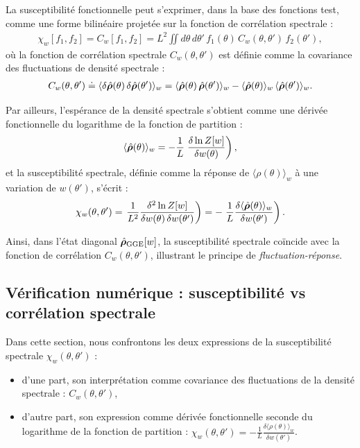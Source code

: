 La susceptibilité fonctionnelle peut s’exprimer, dans la base des fonctions test, comme une forme bilinéaire projetée sur la fonction de corrélation spectrale :
\begin{eqnarray*}
\chi_w[f_1, f_2] = C_w[f_1, f_2] = L^2 \iint d\theta\, d\theta'\, f_1(\theta)\, C_w(\theta, \theta')\, f_2(\theta'),
\end{eqnarray*}
où la fonction de corrélation spectrale \( C_w(\theta, \theta') \) est définie comme la covariance des fluctuations de densité spectrale :
\begin{eqnarray*}
C_w(\theta, \theta') \doteq \langle \delta \hat{\bm{\rho}}(\theta)\, \delta \hat{\bm{\rho}}(\theta') \rangle_w = \langle \hat{\bm{\rho}}(\theta)\, \hat{\bm{\rho}}(\theta') \rangle_w - \langle \hat{\bm{\rho}}(\theta) \rangle_w\, \langle \hat{\bm{\rho}}(\theta') \rangle_w.
\end{eqnarray*}

Par ailleurs, l’espérance de la densité spectrale s’obtient comme une dérivée fonctionnelle du logarithme de la fonction de partition :
\begin{eqnarray*}
\langle \hat{\bm{\rho}}(\theta) \rangle_w = - \frac{1}{L} \left. \frac{\delta \ln Z[w]}{\delta w(\theta)} \right),
\end{eqnarray*}
et la susceptibilité spectrale, définie comme la réponse de \( \langle \rho(\theta) \rangle_w \) à une variation de \( w(\theta') \), s’écrit :
\begin{eqnarray*}
\chi_w(\theta, \theta') = \left. \frac{1}{L^2} \frac{\delta^2 \ln Z[w]}{\delta w(\theta)\, \delta w(\theta')} \right) = - \left. \frac{1}{L} \frac{\delta \langle \hat{\bm{\rho}}(\theta) \rangle_w}{\delta w(\theta')} \right).
\end{eqnarray*}

Ainsi, dans l’état diagonal \( \hat{\bm{\rho}}_{\mathrm{GGE}}[w] \), la susceptibilité spectrale coïncide avec la fonction de corrélation \( C_w(\theta, \theta') \), illustrant le principe de \emph{fluctuation-réponse}.

\subsection{Vérification numérique : susceptibilité vs corrélation spectrale}

Dans cette section, nous confrontons les deux expressions de la susceptibilité spectrale \( \chi_w(\theta, \theta') \) :
\begin{itemize}[label = $\bullet$]
    \item d'une part, son interprétation comme covariance des fluctuations de la densité spectrale : \( C_w(\theta, \theta') \),
    \item d'autre part, son expression comme dérivée fonctionnelle seconde du logarithme de la fonction de partition : \( \chi_w(\theta, \theta') = - \frac{1}{L} \frac{\delta \langle \rho(\theta) \rangle_w}{\delta w(\theta')} \).
\end{itemize}

